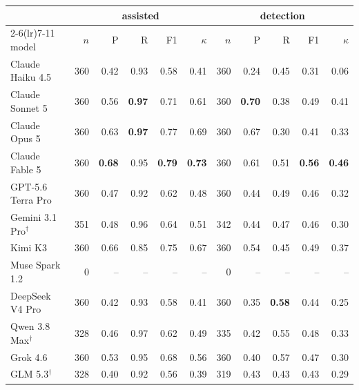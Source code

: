 \begin{tabular}{lrrrrrrrrrr}
\toprule
 & \multicolumn{5}{c}{assisted} & \multicolumn{5}{c}{detection} \\
\cmidrule(lr){2-6}\cmidrule(lr){7-11}
model & $n$ & P & R & F1 & $\kappa$ & $n$ & P & R & F1 & $\kappa$ \\
\midrule
    Claude Haiku 4.5 & 360 & 0.42 & 0.93 & 0.58 & 0.41 & 360 & 0.24 & 0.45 & 0.31 & 0.06 \\
    Claude Sonnet 5 & 360 & 0.56 & \textbf{0.97} & 0.71 & 0.61 & 360 & \textbf{0.70} & 0.38 & 0.49 & 0.41 \\
    Claude Opus 5 & 360 & 0.63 & \textbf{0.97} & 0.77 & 0.69 & 360 & 0.67 & 0.30 & 0.41 & 0.33 \\
    Claude Fable 5 & 360 & \textbf{0.68} & 0.95 & \textbf{0.79} & \textbf{0.73} & 360 & 0.61 & 0.51 & \textbf{0.56} & \textbf{0.46} \\
    GPT-5.6 Terra Pro & 360 & 0.47 & 0.92 & 0.62 & 0.48 & 360 & 0.44 & 0.49 & 0.46 & 0.32 \\
    Gemini 3.1 Pro$^{\dagger}$ & 351 & 0.48 & 0.96 & 0.64 & 0.51 & 342 & 0.44 & 0.47 & 0.46 & 0.30 \\
    Kimi K3 & 360 & 0.66 & 0.85 & 0.75 & 0.67 & 360 & 0.54 & 0.45 & 0.49 & 0.37 \\
    Muse Spark 1.2 & 0 & -- & -- & -- & -- & 0 & -- & -- & -- & -- \\
    DeepSeek V4 Pro & 360 & 0.42 & 0.93 & 0.58 & 0.41 & 360 & 0.35 & \textbf{0.58} & 0.44 & 0.25 \\
    Qwen 3.8 Max$^{\dagger}$ & 328 & 0.46 & 0.97 & 0.62 & 0.49 & 335 & 0.42 & 0.55 & 0.48 & 0.33 \\
    Grok 4.6 & 360 & 0.53 & 0.95 & 0.68 & 0.56 & 360 & 0.40 & 0.57 & 0.47 & 0.30 \\
    GLM 5.3$^{\dagger}$ & 328 & 0.40 & 0.92 & 0.56 & 0.39 & 319 & 0.43 & 0.43 & 0.43 & 0.29 \\
\bottomrule
\end{tabular}
